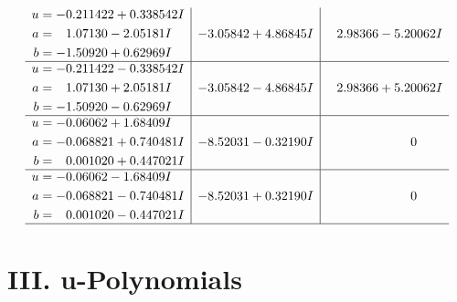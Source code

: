 \documentclass[1p]{elsarticle_modified}
\theoremstyle{definition}
\begin{document}
$$\begin{array}{c|c|c}
\begin{aligned}
u &= -0.211422 + 0.338542 I \\
a &= \phantom{-}1.07130 - 2.05181 I \\
b &= -1.50920 + 0.62969 I\end{aligned}
 & -3.05842 + 4.86845 I & \phantom{-}2.98366 - 5.20062 I \\ \hline\begin{aligned}
u &= -0.211422 - 0.338542 I \\
a &= \phantom{-}1.07130 + 2.05181 I \\
b &= -1.50920 - 0.62969 I\end{aligned}
 & -3.05842 - 4.86845 I & \phantom{-}2.98366 + 5.20062 I \\ \hline\begin{aligned}
u &= -0.06062 + 1.68409 I \\
a &= -0.068821 + 0.740481 I \\
b &= \phantom{-}0.001020 + 0.447021 I\end{aligned}
 & -8.52031 - 0.32190 I & \phantom{-0.000000 } 0 \\ \hline\begin{aligned}
u &= -0.06062 - 1.68409 I \\
a &= -0.068821 - 0.740481 I \\
b &= \phantom{-}0.001020 - 0.447021 I\end{aligned}
 & -8.52031 + 0.32190 I & \phantom{-0.000000 } 0\\
 \hline 
 \end{array}$$\newpage
\newpage\renewcommand{\arraystretch}{1}
\centering \section*{ III. u-Polynomials}
\end{document}
